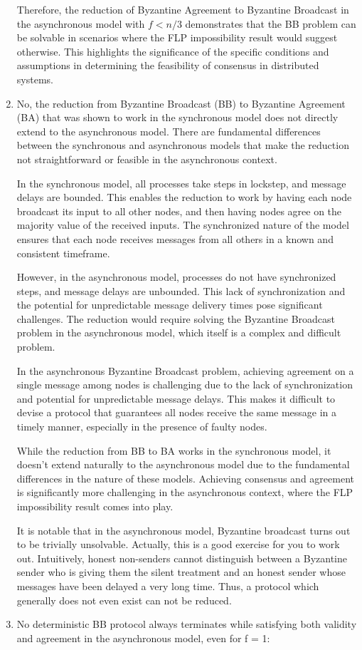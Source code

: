 \documentclass{article}
\begin{document}
\begin{enumerate}
Therefore, the reduction of Byzantine Agreement to Byzantine Broadcast in the asynchronous model with $f < n/3$ demonstrates that the BB problem can be solvable in scenarios where the FLP impossibility result would suggest otherwise. This highlights the significance of the specific conditions and assumptions in determining the feasibility of consensus in distributed systems.

\item %
No, the reduction from Byzantine Broadcast (BB) to Byzantine Agreement (BA) that was shown to work in the synchronous model does not directly extend to the asynchronous model. There are fundamental differences between the synchronous and asynchronous models that make the reduction not straightforward or feasible in the asynchronous context.

In the synchronous model, all processes take steps in lockstep, and message delays are bounded. This enables the reduction to work by having each node broadcast its input to all other nodes, and then having nodes agree on the majority value of the received inputs. The synchronized nature of the model ensures that each node receives messages from all others in a known and consistent timeframe.

However, in the asynchronous model, processes do not have synchronized steps, and message delays are unbounded. This lack of synchronization and the potential for unpredictable message delivery times pose significant challenges. The reduction would require solving the Byzantine Broadcast problem in the asynchronous model, which itself is a complex and difficult problem.

In the asynchronous Byzantine Broadcast problem, achieving agreement on a single message among nodes is challenging due to the lack of synchronization and potential for unpredictable message delays. This makes it difficult to devise a protocol that guarantees all nodes receive the same message in a timely manner, especially in the presence of faulty nodes.

While the reduction from BB to BA works in the synchronous model, it doesn't extend naturally to the asynchronous model due to the fundamental differences in the nature of these models. Achieving consensus and agreement is significantly more challenging in the asynchronous context, where the FLP impossibility result comes into play.

It is notable that in the asynchronous model, Byzantine broadcast turns out to be trivially unsolvable. Actually, this is a good exercise for you to work out. Intuitively, honest non-senders cannot distinguish between a Byzantine sender who is giving them the silent treatment and an honest sender whose messages have been delayed a very long time. Thus, a protocol which generally does not even exist can not be reduced.
\item %
     No deterministic BB protocol always terminates while satisfying both validity and agreement in the asynchronous model, even for f = 1:


\end{enumerate}
\end{document}
